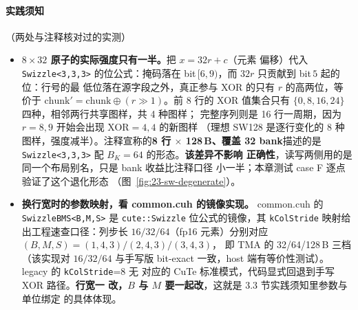 \paragraph{实践须知}（两处与注释核对过的实测）
\begin{itemize}
  \item \textbf{$8\times32$ 原子的实际强度只有一半。}把 $x=32r+c$（元素
        偏移）代入 \texttt{Swizzle\allowbreak{}<3,\allowbreak{}3,\allowbreak{}3>} 的位公式：掩码落在
        bit$\,[6,9)$，而 $32r$ 只贡献到 bit$\,5$ 起的位：行号的最
        低位落在源字段之外，真正参与 XOR 的只有 $r$ 的高两位，等价于
        $\text{chunk}'=\text{chunk}\oplus(r\gg1)$。前 8 行的 XOR 值集合只有
        $\{0,8,16,24\}$ 四种，相邻两行共享图样，共 4 种图样；
        完整序列则是 16 行一周期，因为 $r=8,9$ 开始会出现 XOR$=4,4$ 的新图样
        （理想 SW128 是逐行变化的 8 种图样，强度减半）。注释宣称的\textbf{8 行 $\times$ 128\,B、覆盖 32 bank}描述的是
        \texttt{Swizzle\allowbreak{}<3,\allowbreak{}3,\allowbreak{}3>} 配 $B_K=64$ 的形态。\textbf{该差异不影响
        正确性}，读写两侧用的是同一个布局别名，只是 bank 收益比注释口径
        小一半；本章测试 case F 逐点验证了这个退化形态
        （图~\ref{fig:23-sw-degenerate}）。
  \item \textbf{换行宽时的参数映射，看 common.cuh 的镜像实现。}
        common.cuh 的 \texttt{Swizzle\allowbreak{}BMS\allowbreak{}<B,\allowbreak{}M,\allowbreak{}S>} 是 \texttt{cute::\allowbreak{}Swizzle}
        位公式的镜像，其 \texttt{kColStride} 映射给出工程速查口径：列步长
        $16/32/64$（fp16 元素）分别对应 $(B,M,S)=(1,4,3)/(2,4,3)/(3,4,3)$，
        即 TMA 的 32/64/128\,B 三档（该实现对 $16/32/64$ 与手写版 bit-exact
        一致，host 端有等价性测试）。legacy 的 \texttt{kColStride}=8 无
        对应的 CuTe 标准模式，代码显式回退到手写 XOR 路径。\textbf{行宽一
        改，$B$ 与 $M$ 要一起改}，这就是 3.3 节实践须知里参数与单位绑定
        的具体体现。
\end{itemize}

